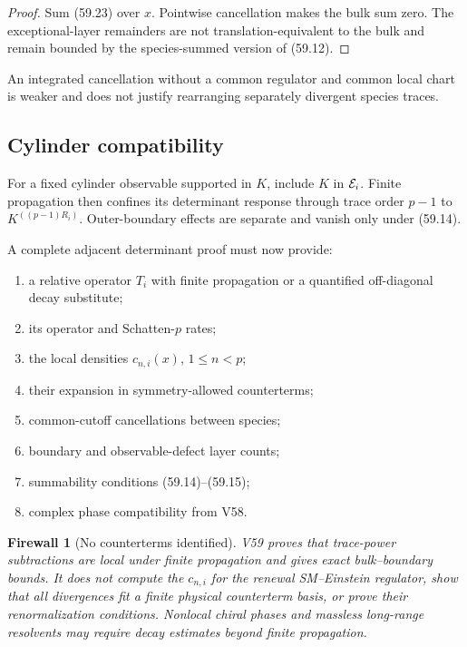 \documentclass[11pt]{article}
\newtheorem{firewall}[theorem]{Firewall}
\begin{document}
\begin{proof}
Sum (59.23) over \(x\).  Pointwise cancellation makes the bulk sum
zero.  The exceptional-layer remainders are not translation-equivalent
to the bulk and remain bounded by the species-summed version of
(59.12).
\end{proof}

An integrated cancellation without a common regulator and common local
chart is weaker and does not justify rearranging separately divergent
species traces.

\subsection{Cylinder compatibility}

For a fixed cylinder observable supported in \(K\), include \(K\) in
\({\cal E}_i\).  Finite propagation then confines its determinant
response through trace order \(p-1\) to
\(K^{((p-1)R_i)}\).  Outer-boundary effects are separate and vanish
only under (59.14).

\begin{ledger}
\label{led:v11v59-row}
A complete adjacent determinant proof must now provide:
\begin{enumerate}
\item a relative operator \(T_i\) with finite propagation or a
quantified off-diagonal decay substitute;
\item its operator and Schatten-\(p\) rates;
\item the local densities \(c_{n,i}(x)\), \(1\le n<p\);
\item their expansion in symmetry-allowed counterterms;
\item common-cutoff cancellations between species;
\item boundary and observable-defect layer counts;
\item summability conditions (59.14)--(59.15);
\item complex phase compatibility from V58.
\end{enumerate}
\end{ledger}

\begin{firewall}[No counterterms identified]
\label{fire:v11v59-boundary}
V59 proves that trace-power subtractions are local under finite
propagation and gives exact bulk--boundary bounds.  It does not compute
the \(c_{n,i}\) for the renewal SM--Einstein regulator, show that all
divergences fit a finite physical counterterm basis, or prove their
renormalization conditions.  Nonlocal chiral phases and massless
long-range resolvents may require decay estimates beyond finite
propagation.
\end{firewall}
\end{document}
